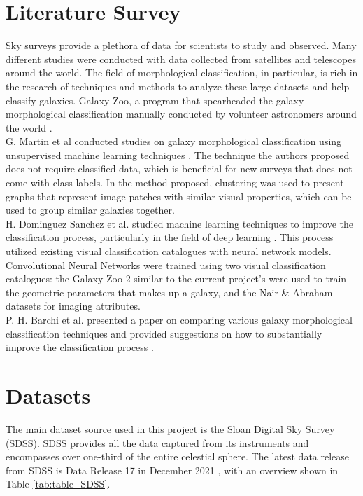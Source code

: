 \documentclass[11pt,sigconf]{acmart}
\begin{document}
\section{Literature Survey}

Sky surveys provide a plethora of data for scientists to study and observed. Many different 
studies were conducted with data collected from satellites and telescopes around the world. 
The field of morphological classification, in particular, is rich in the research of techniques 
and methods to analyze these large datasets and help classify galaxies. Galaxy Zoo, a program 
that spearheaded the galaxy morphological classification manually conducted by volunteer 
astronomers around the world \cite{galaxyzoo1} \cite{galaxyzoo2}. 
\\  
G. Martin et al conducted studies on galaxy morphological classification using unsupervised 
machine learning techniques \cite{gmartin}. The technique the authors proposed does not require 
classified data, which is beneficial for new surveys that does not come with class labels. In the 
method proposed, clustering was used to present graphs that represent image patches with 
similar visual properties, which can be used to group similar galaxies together. 
\\
H. Dominguez Sanchez et al. studied machine learning techniques to improve the 
classification process, particularly in the field of deep learning \cite{hsanchez}. 
This process utilized existing visual classification catalogues with neural network models. 
Convolutional Neural Networks were trained using two visual classification catalogues: 
the Galaxy Zoo 2 similar to the current project's were used to train the geometric parameters 
that makes up a galaxy, and the Nair \& Abraham datasets for imaging attributes. 
\\
P. H. Barchi et al. presented a paper on comparing various galaxy morphological classification 
techniques and provided suggestions on how to substantially improve the classification 
process \cite{phbarchi}. 



\section{Datasets}

The main dataset source used in this project is the Sloan Digital Sky Survey (SDSS). 
SDSS provides all the data captured from its instruments and encompasses over one-third
of the entire celestial sphere. The latest data release from SDSS is Data Release 17 in
December 2021 \cite{abdurro}, with an overview shown in Table \ref{tab:table_SDSS}. 
\end{document}
